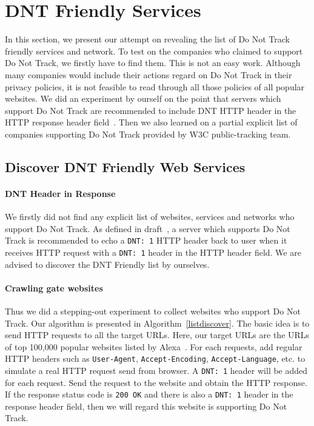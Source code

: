 \documentclass{sig-alternate}
\begin{document}
\section{DNT Friendly Services} \label{sec:services}

In this section, we present our attempt on revealing the list of Do Not Track friendly services and network. To test on the companies who claimed to support Do Not Track, we firstly have to find them. This is not an easy work. Although many companies would include their actions regard on Do Not Track in their privacy policies, it is not feasible to read through all those policies of all popular websites. We did an experiment by ourself on the point that servers which support Do Not Track are recommended to include DNT HTTP header in the HTTP response header field~\cite{dntdraft}. Then we also learned on a partial explicit list of companies supporting Do Not Track provided by W3C public-tracking team.

\subsection{Discover DNT Friendly Web Services} \label{sec:dntheadertest}

\paragraph{DNT Header in Response}
We firstly did not find any explicit list of websites, services and networks who support Do Not Track. As defined in draft~\cite{dntdraft}, a server which supports Do Not Track is recommended to echo a \verb|DNT: 1| HTTP header back to user when it receives HTTP request with a \verb|DNT: 1| header in the HTTP header field. We are advised to discover the DNT Friendly list by ourselves.

\paragraph{Crawling gate websites}
Thus we did a stepping-out experiment to collect websites who support Do Not Track. Our algorithm is presented in Algorithm~\ref{listdiscover}. The basic idea is to send HTTP requests to all the target URLs. Here, our target URLs are the URLs of top 100,000 popular websites listed by Alexa~\cite{alexa}. For each requests, add regular HTTP headers such as \texttt{User-Agent}, \texttt{Accept-Encoding}, \texttt{Accept-Language}, etc. to simulate a real HTTP request send from browser. A \verb|DNT: 1| header will be added for each request. Send the request to the website and obtain the HTTP response. If the response status code is \verb|200 OK| and there is also a \verb|DNT: 1| header in the response header field, then we will regard this website is supporting Do Not Track.
\end{document}
